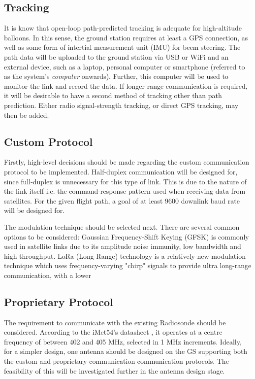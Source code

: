 \subsection{Tracking}
It is know that open-loop path-predicted tracking is adequate for high-altitude balloons. In this sense, the ground station requires at least a GPS connection, as well as some form of intertial measurement unit (IMU) for beem steering. The path data will be uploaded to the ground station via USB or WiFi and an external device, such as a laptop, personal computer or smartphone (referred to as the system's \textit{computer} onwards). Further, this computer will be used to monitor the link and record the data. If longer-range communication is required, it will be desirable to have a second method of tracking other than path prediction. Either radio signal-strength tracking, or direct GPS tracking, may then be added.

\subsection{Custom Protocol}
Firstly, high-level decisions should be made regarding the custom communication protocol to be implemented. Half-duplex communication will be designed for, since full-duplex is unnecessary for this type of link. This is due to the nature of the link itself i.e. the command-response pattern used when receiving data from satellites. For the given flight path, a goal of at least 9600 downlink baud rate will be designed for.

The modulation technique should be selected next. There are several common options to be considered: Gaussian Frequency-Shift Keying (GFSK) is commonly used in satellite links due to its amplitude noise immunity, low bandwidth and high throughput. LoRa (Long-Range) technology is a relatively new modulation technique which uses frequency-varying "chirp" signals to provide ultra long-range communication, with a lower 

\subsection{Proprietary Protocol}
The requirement to communicate with the existing Radiosonde should be considered. According to the iMet54's datasheet \cite{datasheet-iMet54}, it operates at a centre frequency of between 402 and 405 MHz, selected in 1 MHz increments. Ideally, for a simpler design, one antenna should be designed on the GS supporting both the custom and proprietary communication communication protocols. The feasibility of this will be investigated further in the antenna design stage.

